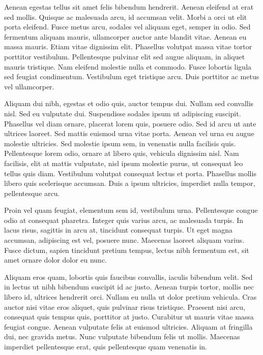 \documentclass[journal]{IEEEtran}
\begin{document}
Aenean egestas tellus sit amet felis bibendum hendrerit. Aenean eleifend at erat sed mollis. Quisque ac malesuada arcu, id accumsan velit. Morbi a orci ut elit porta eleifend. Fusce metus arcu, sodales vel aliquam eget, semper in odio. Sed fermentum aliquam mauris, ullamcorper auctor ante blandit vitae. Aenean eu massa mauris. Etiam vitae dignissim elit. Phasellus volutpat massa vitae tortor porttitor vestibulum. Pellentesque pulvinar elit sed augue aliquam, in aliquet mauris tristique. Nam eleifend molestie nulla et commodo. Fusce lobortis ligula sed feugiat condimentum. Vestibulum eget tristique arcu. Duis porttitor ac metus vel ullamcorper.

Aliquam dui nibh, egestas et odio quis, auctor tempus dui. Nullam sed convallis nisl. Sed eu vulputate dui. Suspendisse sodales ipsum ut adipiscing suscipit. Phasellus vel diam ornare, placerat lorem quis, posuere odio. Sed id arcu ut ante ultrices laoreet. Sed mattis euismod urna vitae porta. Aenean vel urna eu augue molestie ultricies. Sed molestie ipsum sem, in venenatis nulla facilisis quis. Pellentesque lorem odio, ornare at libero quis, vehicula dignissim nisl. Nam facilisis, elit at mattis vulputate, nisl ipsum molestie purus, ut consequat leo tellus quis diam. Vestibulum volutpat consequat lectus et porta. Phasellus mollis libero quis scelerisque accumsan. Duis a ipsum ultricies, imperdiet nulla tempor, pellentesque arcu.

Proin vel quam feugiat, elementum sem id, vestibulum urna. Pellentesque congue odio at consequat pharetra. Integer quis varius arcu, ac malesuada turpis. In lacus risus, sagittis in arcu at, tincidunt consequat turpis. Ut eget magna accumsan, adipiscing est vel, posuere nunc. Maecenas laoreet aliquam varius. Fusce dictum, sapien tincidunt pretium tempus, lectus nibh fermentum est, sit amet ornare dolor dolor eu nunc.

Aliquam eros quam, lobortis quis faucibus convallis, iaculis bibendum velit. Sed in lectus ut nibh bibendum suscipit id ac justo. Aenean turpis tortor, mollis nec libero id, ultrices hendrerit orci. Nullam eu nulla ut dolor pretium vehicula. Cras auctor nisi vitae eros aliquet, quis pulvinar risus tristique. Praesent nisi arcu, consequat quis tempus quis, porttitor at justo. Curabitur ut mauris vitae massa feugiat congue. Aenean vulputate felis at euismod ultricies. Aliquam at fringilla dui, nec gravida metus. Nunc vulputate bibendum felis ut mollis. Maecenas imperdiet pellentesque erat, quis pellentesque quam venenatis in.
\end{document}
